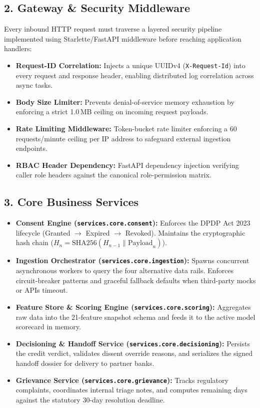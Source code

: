 \subsection{2. Gateway \& Security Middleware}
Every inbound HTTP request must traverse a layered security pipeline implemented using Starlette/FastAPI middleware before reaching application handlers:
\begin{itemize}
  \item \textbf{Request-ID Correlation:} Injects a unique UUIDv4 (\texttt{X-Request-Id}) into every request and response header, enabling distributed log correlation across async tasks.
  \item \textbf{Body Size Limiter:} Prevents denial-of-service memory exhaustion by enforcing a strict 1.0\,MB ceiling on incoming request payloads.
  \item \textbf{Rate Limiting Middleware:} Token-bucket rate limiter enforcing a 60 requests/minute ceiling per IP address to safeguard external ingestion endpoints.
  \item \textbf{RBAC Header Dependency:} FastAPI dependency injection verifying caller role headers against the canonical role-permission matrix.
\end{itemize}

\subsection{3. Core Business Services}
\begin{itemize}
  \item \textbf{Consent Engine (\texttt{services.core.consent}):} Enforces the DPDP Act 2023 lifecycle (Granted $\rightarrow$ Expired $\rightarrow$ Revoked). Maintains the cryptographic hash chain ($H_n = \text{SHA256}(H_{n-1} \parallel \text{Payload}_n)$).
  \item \textbf{Ingestion Orchestrator (\texttt{services.core.ingestion}):} Spawns concurrent asynchronous workers to query the four alternative data rails. Enforces circuit-breaker patterns and graceful fallback defaults when third-party mocks or APIs timeout.
  \item \textbf{Feature Store \& Scoring Engine (\texttt{services.core.scoring}):} Aggregates raw data into the 21-feature snapshot schema and feeds it to the active model scorecard in memory.
  \item \textbf{Decisioning \& Handoff Service (\texttt{services.core.decisioning}):} Persists the credit verdict, validates dissent override reasons, and serializes the signed handoff dossier for delivery to partner banks.
  \item \textbf{Grievance Service (\texttt{services.core.grievance}):} Tracks regulatory complaints, coordinates internal triage notes, and computes remaining days against the statutory 30-day resolution deadline.
\end{itemize}

